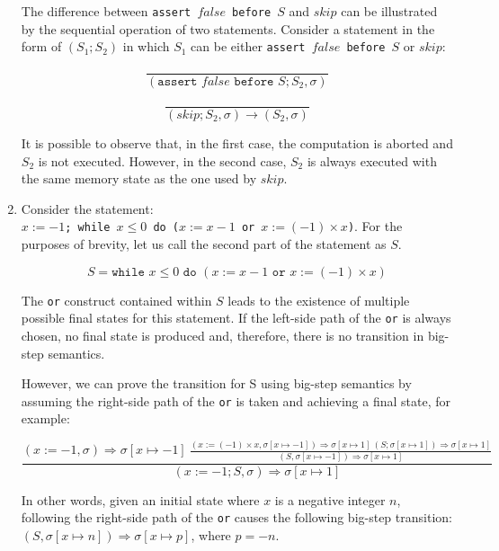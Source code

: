 \documentclass[11pt]{article}
\begin{document}
\begin{enumerate}
		The difference between \texttt{assert $false$ before $S$} and $skip$ can be illustrated by the sequential operation of two statements.	Consider a statement in the form of $(S_1;S_2)$ in which $S_1$ can be either \texttt{assert $false$ before $S$} or $skip$:
		
		\begin{equation*}
			\frac{}{(\texttt{assert }false\texttt{ before }S;S_2,\sigma)}	
		\end{equation*}
		
		\begin{equation*}
			\frac{}{(skip; S_2,\sigma)\rightarrow (S_2,\sigma)}	
		\end{equation*}

		It is possible to observe that, in the first case, the computation is aborted and $S_2$ is not executed. However, in the second case, $S_2$ is always executed with the same memory state as the one used by $skip$.
		
	\item Consider the statement:\\ \texttt{$x:= -1$; while $x\leq 0$ do ($x:=x-1$ or $x:= (-1)\times x$)}.
	For the purposes of brevity, let us call the second part of the statement as $S$.
	
	\begin{equation*}
		S = \texttt{while }x\leq 0\texttt{ do }(x:=x-1\texttt{ or }x:= (-1)\times x)
	\end{equation*}
	
	The \texttt{or} construct contained within $S$ leads to the existence of multiple possible final states for this statement. If the left-side path of the \texttt{or} is always chosen, no final state is produced and, therefore, there is no transition in big-step semantics.
	
	However, we can prove the transition for S using big-step semantics by assuming the right-side path of the \texttt{or} is taken and achieving a final state, for example:
	
	\begin{equation*}
		\frac{(x:=-1,\sigma)\Rightarrow\sigma[x\mapsto-1]\ \frac{(x:=(-1)\times x,\sigma[x\mapsto -1])\Rightarrow\sigma[x\mapsto1]\ (S;\sigma[x\mapsto 1])\Rightarrow\sigma[x\mapsto 1]}{(S,\sigma[x\mapsto -1])\Rightarrow \sigma[x\mapsto 1]}}{(x:=-1;S,\sigma)\Rightarrow\sigma[x\mapsto 1]}
	\end{equation*}
	
	In other words, given an initial state where $x$ is a negative integer $n$, following the right-side path of the \texttt{or} causes the following big-step transition: $(S,\sigma[x\mapsto n]) \Rightarrow \sigma[x\mapsto p]$, where $p = -n$.
	

\end{enumerate}
\end{document}
